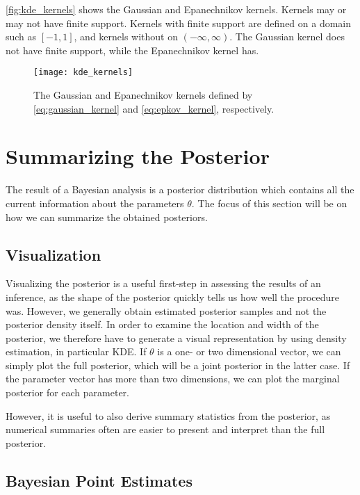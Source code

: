 \autoref{fig:kde_kernels} shows the Gaussian and Epanechnikov kernels. Kernels may or may not have finite support. Kernels with finite support are defined on a domain such as $[-1, 1]$, and kernels without on $(-\infty, \infty)$. The Gaussian kernel does not have finite support, while the Epanechnikov kernel has. 

\begin{figure}[!htb]
    \centering
    \texttt{[image: kde\_kernels]}
    \caption{The Gaussian and Epanechnikov kernels defined by \autoref{eq:gaussian_kernel} and \autoref{eq:epkov_kernel}, respectively.
    }
    \label{fig:kde_kernels}
\end{figure}

\section{Summarizing the Posterior}

The result of a Bayesian analysis is a posterior distribution which contains all the current information about the parameters $\theta$. The focus of this section will be on how we can summarize the obtained posteriors.%


\subsection{Visualization} 

Visualizing the posterior is a useful first-step in assessing the results of an inference, as the shape of the posterior quickly tells us how well the procedure was. However, we generally obtain estimated posterior samples and not the posterior density itself. In order to examine the location and width of the posterior, we therefore have to generate a visual representation by using density estimation, in particular KDE. If $\theta$ is a one- or two dimensional vector, we can simply plot the full posterior, which will be a joint posterior in the latter case. If the parameter vector has more than two dimensions, we can plot the marginal posterior for each parameter.

However, it is useful to also derive summary statistics from the posterior, as numerical summaries often are easier to present and interpret than the full posterior. 

\subsection{Bayesian Point Estimates}

